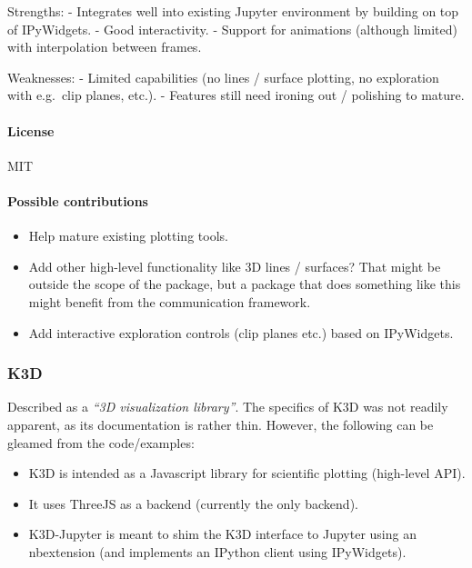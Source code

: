 Strengths: - Integrates well into existing Jupyter environment by
building on top of IPyWidgets. - Good interactivity. - Support for
animations (although limited) with interpolation between frames.

Weaknesses: - Limited capabilities (no lines / surface plotting, no
exploration with e.g.~clip planes, etc.). - Features still need ironing
out / polishing to mature.

\hypertarget{license}{%
\paragraph{License}\label{license}}

MIT

\hypertarget{possible-contributions}{%
\paragraph{Possible contributions}\label{possible-contributions}}

\begin{itemize}
\tightlist
\item
  Help mature existing plotting tools.
\item
  Add other high-level functionality like 3D lines / surfaces? That
  might be outside the scope of the package, but a package that does
  something like this might benefit from the communication framework.
\item
  Add interactive exploration controls (clip planes etc.) based on
  IPyWidgets.
\end{itemize}

    \hypertarget{k3d}{%
\subsubsection{K3D}\label{k3d}}

Described as a \emph{``3D visualization library''}. The specifics of K3D
was not readily apparent, as its documentation is rather thin. However,
the following can be gleamed from the code/examples:

\begin{itemize}
\tightlist
\item
  K3D is intended as a Javascript library for scientific plotting
  (high-level API).
\item
  It uses ThreeJS as a backend (currently the only backend).
\item
  K3D-Jupyter is meant to shim the K3D interface to Jupyter using an
  nbextension (and implements an IPython client using IPyWidgets).
\end{itemize}

